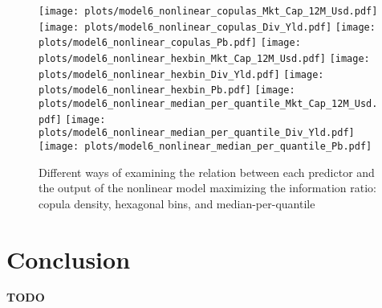 \documentclass[12pt]{article}
\begin{document}
\begin{figure}[htbp]
\centering
\texttt{[image: plots/model6\_nonlinear\_copulas\_Mkt\_Cap\_12M\_Usd.pdf]}%
\texttt{[image: plots/model6\_nonlinear\_copulas\_Div\_Yld.pdf]}%
\texttt{[image: plots/model6\_nonlinear\_copulas\_Pb.pdf]}
\texttt{[image: plots/model6\_nonlinear\_hexbin\_Mkt\_Cap\_12M\_Usd.pdf]}%
\texttt{[image: plots/model6\_nonlinear\_hexbin\_Div\_Yld.pdf]}%
\texttt{[image: plots/model6\_nonlinear\_hexbin\_Pb.pdf]}
\texttt{[image: plots/model6\_nonlinear\_median\_per\_quantile\_Mkt\_Cap\_12M\_Usd.pdf]}%
\texttt{[image: plots/model6\_nonlinear\_median\_per\_quantile\_Div\_Yld.pdf]}%
\texttt{[image: plots/model6\_nonlinear\_median\_per\_quantile\_Pb.pdf]}
\caption{Different ways of examining the relation between each predictor and the output
of the nonlinear model maximizing the information ratio: copula density, hexagonal bins, 
and median-per-quantile}
\label{fig:non-linear}
\end{figure}

\clearpage
\section{Conclusion}

\textbf{TODO}


\clearpage
\nocite{*}


\end{document}
